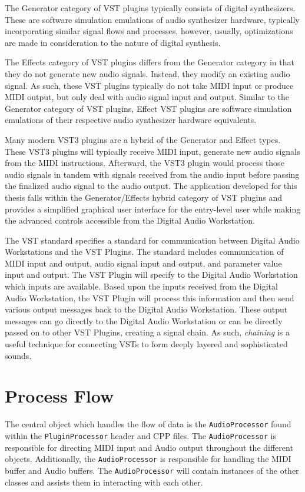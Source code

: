 \documentclass[a4paper,12pt]{report}
\begin{document}
The Generator category of VST plugins typically consists of digital synthesizers. These are software simulation emulations of audio synthesizer hardware, typically incorporating similar signal flows and processes, however, usually, optimizations are made in consideration to the nature of digital synthesis. 

The Effects category of VST plugins differs from the Generator category in that they do not generate new audio signals. Instead, they modify an existing audio signal. As such, these VST plugins typically do not take MIDI input or produce MIDI output, but only deal with audio signal input and output. Similar to the Generator category of VST plugins, Effect VST plugins are software simulation emulations of their respective audio synthesizer hardware equivalents.

Many modern VST3 plugins are a hybrid of the Generator and Effect types. These VST3 plugins will typically receive MIDI input, generate new audio signals from the MIDI instructions. Afterward, the VST3 plugin would process those audio signals in tandem with signals received from the audio input before passing the finalized audio signal to the audio output. The application developed for this thesis falls within the Generator/Effects hybrid category of VST plugins and provides a simplified graphical user interface for the entry-level user while making the advanced controls accessible from the Digital Audio Workstation.

The VST standard specifies a standard for communication between Digital Audio Workstations and the VST Plugins. The standard includes communication of MIDI input and output, audio signal input and output, and parameter value input and output. The VST Plugin will specify to the Digital Audio Workstation which inputs are available. Based upon the inputs received from the Digital Audio Workstation, the VST Plugin will process this information and then send various output messages back to the Digital Audio Workstation. These output messages can go directly to the Digital Audio Workstation or can be directly passed on to other VST Plugins, creating a signal chain. As such, \emph{chaining} is a useful technique for connecting VSTs to form deeply layered and sophisticated sounds.

\section{Process Flow}
\label{sec:processflow}
The central object which handles the flow of data is the \texttt{AudioProcessor} found within the \texttt{PluginProcessor} header and CPP files. The \texttt{AudioProcessor} is responsible for directing MIDI input and Audio output throughout the different objects. Additionally, the \texttt{AudioProcessor} is responsible for handling the MIDI buffer and Audio buffers. The \texttt{AudioProcessor} will contain instances of the other classes and assists them in interacting with each other.
\end{document}
